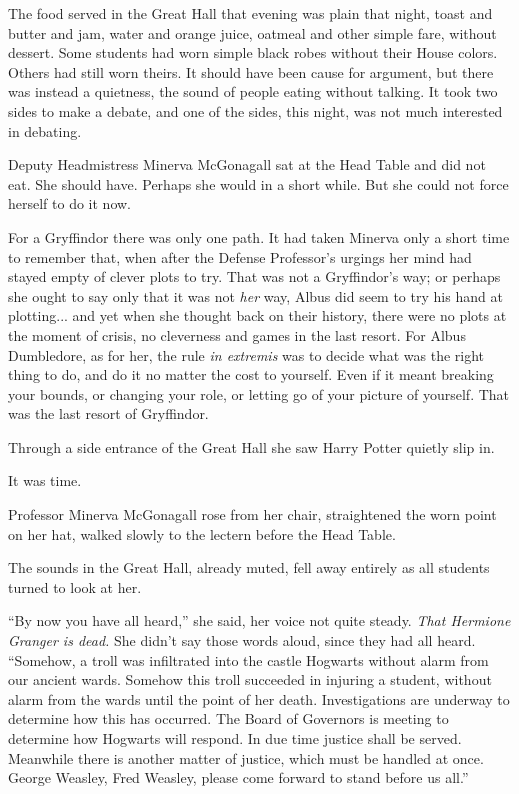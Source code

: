 The food served in the Great Hall that evening was plain that night,
toast and butter and jam, water and orange juice, oatmeal and other
simple fare, without dessert. Some students had worn simple black robes
without their House colors. Others had still worn theirs. It should have
been cause for argument, but there was instead a quietness, the sound of
people eating without talking. It took two sides to make a debate, and
one of the sides, this night, was not much interested in debating.

Deputy Headmistress Minerva McGonagall sat at the Head Table and did not
eat. She should have. Perhaps she would in a short while. But she could
not force herself to do it now.

For a Gryffindor there was only one path. It had taken Minerva only a
short time to remember that, when after the Defense Professor's urgings
her mind had stayed empty of clever plots to try. That was not a
Gryffindor's way; or perhaps she ought to say only that it was not
\emph{her} way, Albus did seem to try his hand at plotting... and
yet when she thought back on their history, there were no plots at the
moment of crisis, no cleverness and games in the last resort. For Albus
Dumbledore, as for her, the rule \emph{in extremis} was to decide what
was the right thing to do, and do it no matter the cost to yourself.
Even if it meant breaking your bounds, or changing your role, or letting
go of your picture of yourself. That was the last resort of Gryffindor.

Through a side entrance of the Great Hall she saw Harry Potter quietly
slip in.

It was time.

Professor Minerva McGonagall rose from her chair, straightened the worn
point on her hat, walked slowly to the lectern before the Head Table.

The sounds in the Great Hall, already muted, fell away entirely as all
students turned to look at her.

``By now you have all heard,'' she said, her voice not quite steady.
\emph{That Hermione Granger is dead.} She didn't say those words aloud,
since they had all heard. ``Somehow, a troll was infiltrated into the
castle Hogwarts without alarm from our ancient wards. Somehow this troll
succeeded in injuring a student, without alarm from the wards until the
point of her death. Investigations are underway to determine how this
has occurred. The Board of Governors is meeting to determine how
Hogwarts will respond. In due time justice shall be served. Meanwhile
there is another matter of justice, which must be handled at once.
George Weasley, Fred Weasley, please come forward to stand before us
all.''


